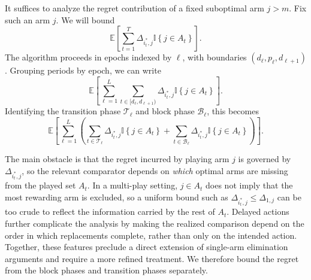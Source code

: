 \documentclass[opre,blindrev]{informs3}
\newcommand{\ind}[1]{\mathbb{I}\left\{#1\right\}}
\newcommand{\bE}[1]{{\mathbb{E}\left[#1\right]}}
\begin{document}
\begin{APPENDICES}
It suffices to analyze the regret contribution of a fixed suboptimal arm \(j>m\). Fix such an arm \(j\). We will bound
\[
    \bE{\sum_{t=1}^T \Delta_{i_t^*,j} \ind{j\in A_t}}.
\]
The algorithm proceeds in epochs indexed by \(\ell\), with boundaries \((d_\ell,p_\ell,d_{\ell+1})\). Grouping periods by epoch, we can write
\[
    \bE{\sum_{\ell=1}^L \sum_{t\in[d_\ell,d_{\ell+1})} \Delta_{i_t^*,j} \ind{j\in A_t}}.
\]
Identifying the transition phase \(\mathcal{T}_{\ell}\) and block phase \(\mathcal{B}_{\ell}\), this becomes
\[
    \bE{\sum_{\ell=1}^L \left(\sum_{t\in \mathcal{T}_\ell} \Delta_{i_t^*,j} \ind{j\in A_t}
    + \sum_{t\in \mathcal{B}_{\ell}} \Delta_{i_t^*,j} \ind{j\in A_t}\right)}.
\]

The main obstacle is that the regret incurred by playing arm \(j\) is governed by \(\Delta_{i_t^*,j}\), so the relevant comparator depends on \emph{which} optimal arms are missing from the played set \(A_t\). In a multi-play setting, \(j\in A_t\) does not imply that the most rewarding arm is excluded, so a uniform bound such as \(\Delta_{i_t^*,j} \leq \Delta_{1,j}\) can be too crude to reflect the information carried by the rest of \(A_t\). Delayed actions further complicate the analysis by making the realized comparison depend on the order in which replacements complete, rather than only on the intended action. Together, these features preclude a direct extension of single-arm elimination arguments and require a more refined treatment. We therefore bound the regret from the block phases and transition phases separately.


\end{APPENDICES}
\end{document}
